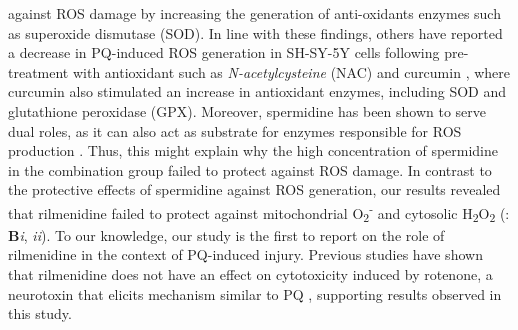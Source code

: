 against ROS damage by increasing the generation of anti-oxidants enzymes such as superoxide dismutase (SOD). In line with these findings, others have reported a decrease in PQ-induced ROS generation in SH-SY-5Y cells following pre-treatment with antioxidant such as \textit{N-acetylcysteine} (NAC) \citep{Zhou2017} and curcumin \citep{Jaroonwitchawan2017}, where curcumin also stimulated an increase in antioxidant enzymes, including SOD and glutathione peroxidase (GPX). Moreover, spermidine has been shown to serve dual roles, as it can also act as substrate for enzymes responsible for ROS production \citep{Stewart2018}. Thus, this might explain why the high concentration of spermidine in the combination group failed to protect against ROS damage. In contrast to the protective effects of spermidine against ROS generation, our results revealed that rilmenidine failed to protect against mitochondrial O\textsubscript{2}\textsuperscript{-} and cytosolic H\textsubscript{2}O\textsubscript{2} (: \textbf{B}\textit{i}, \textit{ii}). To our knowledge, our study is the first to report on the role of  rilmenidine in the context of PQ-induced injury. Previous studies have shown that rilmenidine does not have an effect on cytotoxicity induced by rotenone, a neurotoxin that elicits mechanism similar to PQ \citep{Choi2002}, supporting results observed in this study.

